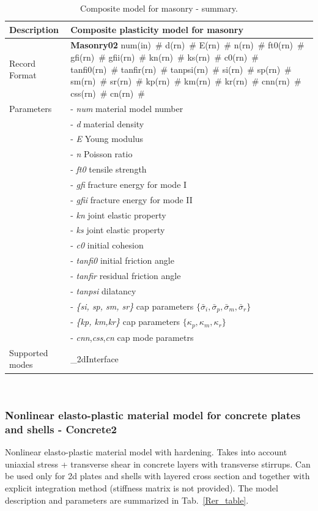 \documentclass[a4paper]{article}
\newcommand{\descitem}[1]{{\noindent \bf #1}}
\newcommand{\elemparam}[2]{{{#1\tiny (#2)}~\#}}
\newcommand{\param}[1]{{\it #1}}
\newenvironment{mmt}{\begin{tabular}{|l|p{9cm}|}}{\end{tabular}\\}
\newenvironment{mmt}{\begin{tabular}{|l|l|}}{\end{tabular}\\}
\begin{document}
\begin{table}[!htb]
\begin{mmt}
\hline
Description & Composite plasticity model for masonry\\
\hline
Record Format & \descitem{Masonry02} \elemparam{num}{in} \elemparam{d}{rn} \elemparam{E}{rn}
\elemparam{n}{rn} \elemparam{ft0}{rn} \elemparam{gfi}{rn}
\elemparam{gfii}{rn}
\elemparam{kn}{rn} \elemparam{ks}{rn} \elemparam{c0}{rn}
\elemparam{tanfi0}{rn} \elemparam{tanfir}{rn} \elemparam{tanpsi}{rn}
\elemparam{si}{rn} \elemparam{sp}{rn} \elemparam{sm}{rn} \elemparam{sr}{rn}
\elemparam{kp}{rn} \elemparam{km}{rn} \elemparam{kr}{rn}
\elemparam{cnn}{rn} \elemparam{css}{rn} \elemparam{cn}{rn}\\
Parameters &- \param{num} material model number\\
&- \param{d} material density\\
&- \param{E} Young modulus\\
&- \param{n} Poisson ratio\\
&- \param{ft0} tensile strength\\
&- \param{gfi} fracture energy for mode I\\
&- \param{gfii} fracture energy for mode II\\
&- \param{kn} joint elastic property\\
&- \param{ks} joint elastic property\\
&- \param{c0} initial cohesion\\
&- \param{tanfi0} initial friction angle\\
&- \param{tanfir} residual friction angle\\
&- \param{tanpsi} dilatancy\\
&- \param{\{si, sp, sm, sr\}} cap parameters $\{\bar{\sigma}_i, \bar{\sigma}_p, \bar{\sigma}_m, \bar{\sigma}_r\}$\\
&- \param{\{kp, km,kr\}} cap parameters $\{\kappa_p, \kappa_m, \kappa_r\}$\\
&- \param{cnn},\param{css},\param{cn} cap mode parametrs\\
Supported modes& \_2dInterface\\
\hline
\end{mmt}
\caption{Composite model for masonry - summary.}
\label{compomasonry1_table}
\end{table}



\subsubsection{Nonlinear elasto-plastic material model for concrete
plates and shells - Concrete2}
\label{Rer}
Nonlinear elasto-plastic material model with hardening.
Takes into account uniaxial stress + transverse shear in concrete
layers with transverse stirrups.
Can be used only for 2d plates and shells with layered cross section
and together with explicit integration method (stiffness matrix is not
provided).
The model description and parameters are summarized
in Tab.~\ref{Rer_table}.
\end{document}
